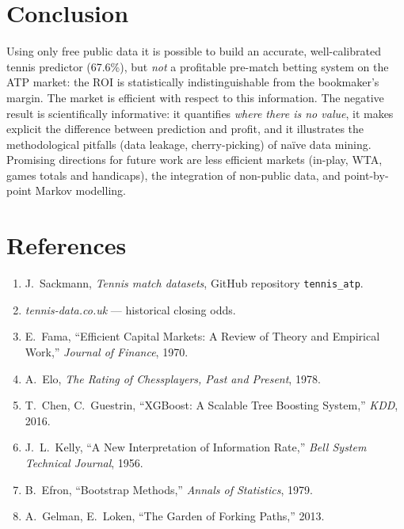 \documentclass[10pt,twocolumn]{article}
\begin{document}
\section{Conclusion}
Using only free public data it is possible to build an accurate, well-calibrated
tennis predictor (67.6\%), but \emph{not} a profitable pre-match betting system
on the ATP market: the ROI is statistically indistinguishable from the
bookmaker's margin. The market is efficient with respect to this information.
The negative result is scientifically informative: it quantifies \emph{where
there is no value}, it makes explicit the difference between prediction and
profit, and it illustrates the methodological pitfalls (data leakage,
cherry-picking) of na\"ive data mining. Promising directions for future work are
less efficient markets (in-play, WTA, games totals and handicaps), the
integration of non-public data, and point-by-point Markov modelling.

\section{References}
\begin{enumerate}[leftmargin=1.6em,itemsep=1pt]
  \item J.~Sackmann, \textit{Tennis match datasets}, GitHub repository
        \texttt{tennis\_atp}.
  \item \textit{tennis-data.co.uk} --- historical closing odds.
  \item E.~Fama, ``Efficient Capital Markets: A Review of Theory and Empirical
        Work,'' \textit{Journal of Finance}, 1970.
  \item A.~Elo, \textit{The Rating of Chessplayers, Past and Present}, 1978.
  \item T.~Chen, C.~Guestrin, ``XGBoost: A Scalable Tree Boosting System,''
        \textit{KDD}, 2016.
  \item J.~L.~Kelly, ``A New Interpretation of Information Rate,''
        \textit{Bell System Technical Journal}, 1956.
  \item B.~Efron, ``Bootstrap Methods,'' \textit{Annals of Statistics}, 1979.
  \item A.~Gelman, E.~Loken, ``The Garden of Forking Paths,'' 2013.
\end{enumerate}
\end{document}

